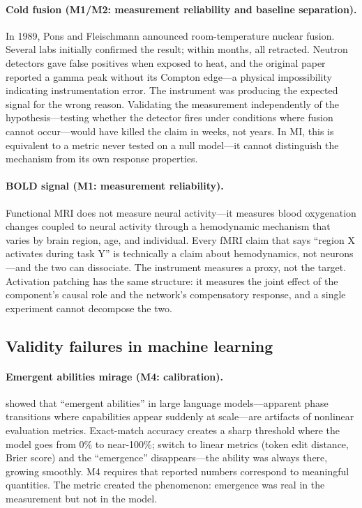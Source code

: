 \documentclass{article}
\begin{document}
\paragraph{Cold fusion (M1/M2: measurement reliability and baseline separation).}
In 1989, Pons and Fleischmann announced room-temperature nuclear fusion. Several labs initially confirmed the result; within months, all retracted. Neutron detectors gave false positives when exposed to heat, and the original paper reported a gamma peak without its Compton edge---a physical impossibility indicating instrumentation error. The instrument was producing the expected signal for the wrong reason. Validating the measurement independently of the hypothesis---testing whether the detector fires under conditions where fusion cannot occur---would have killed the claim in weeks, not years. In MI, this is equivalent to a metric never tested on a null model---it cannot distinguish the mechanism from its own response properties.

\paragraph{BOLD signal (M1: measurement reliability).}
Functional MRI does not measure neural activity---it measures blood oxygenation changes coupled to neural activity through a hemodynamic mechanism that varies by brain region, age, and individual. Every fMRI claim that says ``region X activates during task Y'' is technically a claim about hemodynamics, not neurons---and the two can dissociate. The instrument measures a proxy, not the target. Activation patching has the same structure: it measures the joint effect of the component's causal role and the network's compensatory response, and a single experiment cannot decompose the two.

\subsection{Validity failures in machine learning}

\paragraph{Emergent abilities mirage (M4: calibration).}
\citet{schaeffer2023emergent} showed that ``emergent abilities'' in large language models---apparent phase transitions where capabilities appear suddenly at scale---are artifacts of nonlinear evaluation metrics. Exact-match accuracy creates a sharp threshold where the model goes from 0\% to near-100\%; switch to linear metrics (token edit distance, Brier score) and the ``emergence'' disappears---the ability was always there, growing smoothly. M4 requires that reported numbers correspond to meaningful quantities. The metric created the phenomenon: emergence was real in the measurement but not in the model.
\end{document}
